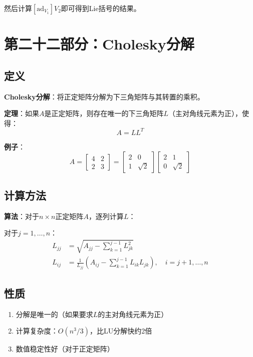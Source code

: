 \documentclass[12pt,a4paper]{article}
\begin{document}
然后计算$[\text{ad}_{V_1}] V_2$即可得到Lie括号的结果。

\section{第二十二部分：Cholesky分解}

\subsection{定义}

\textbf{Cholesky分解}：将正定矩阵分解为下三角矩阵与其转置的乘积。

\textbf{定理}：如果$A$是正定矩阵，则存在唯一的下三角矩阵$L$（主对角线元素为正），使得：
\begin{equation}
A = L L^T
\end{equation}

\textbf{例子}：
\begin{equation}
A = \begin{bmatrix} 4 & 2 \\ 2 & 3 \end{bmatrix} = \begin{bmatrix} 2 & 0 \\ 1 & \sqrt{2} \end{bmatrix} \begin{bmatrix} 2 & 1 \\ 0 & \sqrt{2} \end{bmatrix}
\end{equation}

\subsection{计算方法}

\textbf{算法}：对于$n \times n$正定矩阵$A$，逐列计算$L$：

对于$j = 1, \ldots, n$：
\begin{align}
L_{jj} &= \sqrt{A_{jj} - \sum_{k=1}^{j-1} L_{jk}^2} \\
L_{ij} &= \frac{1}{L_{jj}}\left(A_{ij} - \sum_{k=1}^{j-1} L_{ik} L_{jk}\right), \quad i = j+1, \ldots, n
\end{align}

\subsection{性质}

\begin{enumerate}
\item 分解是唯一的（如果要求$L$的主对角线元素为正）
\item 计算复杂度：$O(n^3/3)$，比LU分解快约2倍
\item 数值稳定性好（对于正定矩阵）
\end{enumerate}
\end{document}

